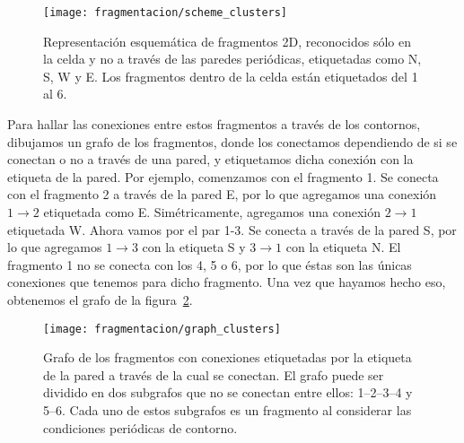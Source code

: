 \begin{figure}  \centering
  \texttt{[image: fragmentacion/scheme\_clusters]}
  \caption{Representación esquemática de fragmentos 2D, reconocidos sólo en la celda y no a través de las paredes periódicas, etiquetadas como N, S, W y E.
  Los fragmentos dentro de la celda están etiquetados del 1 al 6.}
\label{fig:scheme_clusters}
\end{figure}

Para hallar las conexiones entre estos fragmentos a través de los contornos, dibujamos un grafo de los fragmentos, donde los conectamos dependiendo de si se conectan o no a través de una pared, y etiquetamos dicha conexión con la etiqueta de la pared.
Por ejemplo, comenzamos con el fragmento 1.
Se conecta con el fragmento 2 a través de la pared E, por lo que agregamos una conexión $1\rightarrow2$ etiquetada como E.
Simétricamente, agregamos una conexión $2\rightarrow1$ etiquetada W.
Ahora vamos por el par 1-3.
Se conecta a través de la pared S, por lo que agregamos $1\rightarrow3$ con la etiqueta S y $3\rightarrow1$ con la etiqueta N.
El fragmento 1 no se conecta con los 4, 5 o 6, por lo que éstas son las únicas conexiones que tenemos para dicho fragmento.
Una vez que hayamos hecho eso, obtenemos el grafo de la figura~\ref{fig:graph_clusters}.

\begin{figure}  \centering
  \texttt{[image: fragmentacion/graph\_clusters]}
  \caption{Grafo de los fragmentos con conexiones etiquetadas por la etiqueta de la pared a través de la cual se conectan.
    El grafo puede ser dividido en dos subgrafos que no se conectan entre ellos: 1--2--3--4 y 5--6.
    Cada uno de estos subgrafos es un fragmento al considerar las condiciones periódicas de contorno.}
\label{fig:graph_clusters}
\end{figure}

